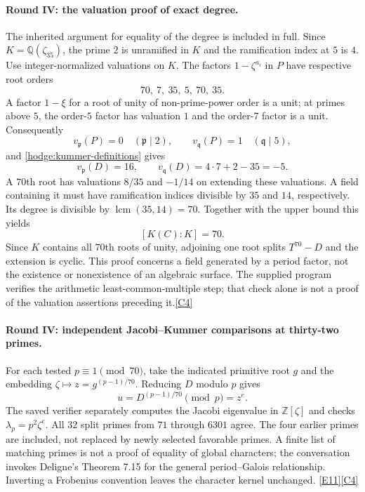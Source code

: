 \documentclass[11pt]{article}
\newcommand{\Q}{\mathbb Q}
\newcommand{\Z}{\mathbb Z}
\newcommand{\src}[1]{\hyperlink{src:#1}{[#1]}}
\begin{document}
\paragraph{Round IV: the valuation proof of exact degree.}
The inherited argument for equality of the degree is included in full.
Since $K=\Q(\zeta_{35})$, the prime $2$ is unramified in $K$ and the
ramification index at $5$ is $4$. Use integer-normalized valuations on $K$.
The factors $1-\zeta^{a_i}$ in $P$ have respective root orders
\[
 70,\ 7,\ 35,\ 5,\ 70,\ 35.
\]
A factor $1-\xi$ for a root of unity of non-prime-power order is a unit;
at primes above $5$, the order-$5$ factor has valuation $1$ and the
order-$7$ factor is a unit. Consequently
\[
 v_{\mathfrak p}(P)=0\quad(\mathfrak p\mid2),\qquad
 v_{\mathfrak q}(P)=1\quad(\mathfrak q\mid5),
\]
and \eqref{hodge:kummer-definitions} gives
\begin{equation}\label{hodge:valuations}
 v_{\mathfrak p}(D)=16,\qquad
 v_{\mathfrak q}(D)=4\cdot7+2-35=-5.
\end{equation}
A $70$th root has valuations $8/35$ and $-1/14$ on extending these
valuations. A field containing it must have ramification indices divisible
by $35$ and $14$, respectively. Its degree is divisible by
$\operatorname{lcm}(35,14)=70$. Together with the upper bound this yields
\begin{equation}\label{hodge:exact-kummer-degree}
 [K(C):K]=70.
\end{equation}
Since $K$ contains all $70$th roots of unity, adjoining one root splits
$T^{70}-D$ and the extension is cyclic. This proof concerns a field generated
by a period factor, not the existence or nonexistence of an algebraic
surface. The supplied program verifies the arithmetic least-common-multiple
step; that check alone is not a proof of the valuation assertions preceding
it.\src{C4}

\paragraph{Round IV: independent Jacobi--Kummer comparisons at thirty-two primes.}
For each tested $p\equiv1\pmod{70}$, take the indicated primitive root $g$
and the embedding $\zeta\mapsto z=g^{(p-1)/70}$. Reducing $D$ modulo $p$
gives
\[
 u=D^{(p-1)/70}\pmod p=z^e.
\]
The saved verifier separately computes the Jacobi eigenvalue in
$\Z[\zeta]$ and checks $\lambda_p=p^2\zeta^e$. All $32$ split primes
from $71$ through $6301$ agree. The four earlier primes are included, not
replaced by newly selected favorable primes. A finite list of matching
primes is not a proof of equality of global characters; the conversation
invokes Deligne's Theorem 7.15 for the general period--Galois relationship.
Inverting a Frobenius convention leaves the character kernel unchanged.
\src{E11}\src{C4}
\end{document}
